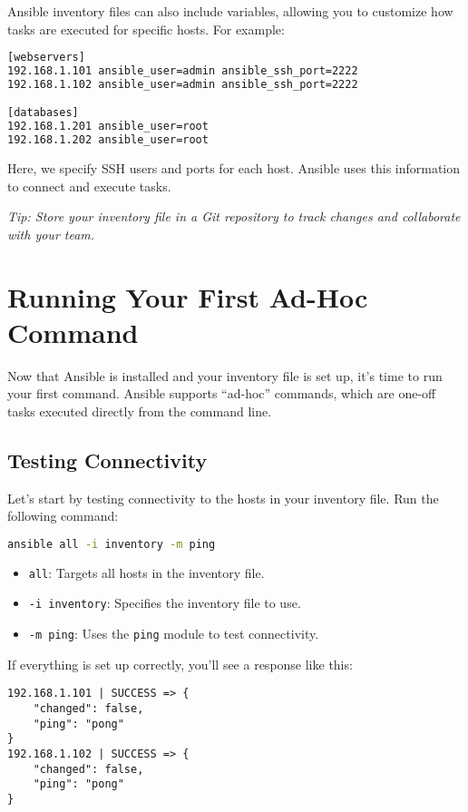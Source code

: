 Ansible inventory files can also include variables, allowing you to customize how tasks are executed for specific hosts. For example:

\begin{lstlisting}[language=bash, caption=Inventory File with Variables]
[webservers]
192.168.1.101 ansible_user=admin ansible_ssh_port=2222
192.168.1.102 ansible_user=admin ansible_ssh_port=2222

[databases]
192.168.1.201 ansible_user=root
192.168.1.202 ansible_user=root
\end{lstlisting}

Here, we specify SSH users and ports for each host. Ansible uses this information to connect and execute tasks.

\textit{Tip: Store your inventory file in a Git repository to track changes and collaborate with your team.}

\section{Running Your First Ad-Hoc Command}

Now that Ansible is installed and your inventory file is set up, it's time to run your first command. Ansible supports “ad-hoc” commands, which are one-off tasks executed directly from the command line.

\subsection{Testing Connectivity}

Let's start by testing connectivity to the hosts in your inventory file. Run the following command:
\begin{lstlisting}[language=bash, caption=Ping All Hosts in Inventory]
ansible all -i inventory -m ping
\end{lstlisting}

\begin{itemize}
    \item \texttt{all}: Targets all hosts in the inventory file.
    \item \texttt{-i inventory}: Specifies the inventory file to use.
    \item \texttt{-m ping}: Uses the \texttt{ping} module to test connectivity.
\end{itemize}

If everything is set up correctly, you'll see a response like this:
\begin{lstlisting}[language=plain, caption=Ping Command Output]
192.168.1.101 | SUCCESS => {
    "changed": false,
    "ping": "pong"
}
192.168.1.102 | SUCCESS => {
    "changed": false,
    "ping": "pong"
}
\end{lstlisting}

